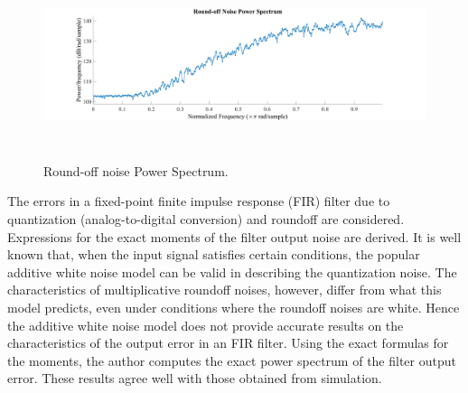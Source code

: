 \begin{enumerate}[label=\roman*]

\par

\par


\vspace{\baselineskip}



\begin{figure}[H]
	\begin{Center}
		\includegraphics[width=6.46in,height=2.19in]{25}
		\caption{ Round-off noise Power Spectrum.}
		\label{fig:_11_Roundoff_noise_Power_Spectrum}
	\end{Center}
\end{figure}


The errors in a fixed-point finite impulse response (FIR) filter due to quantization (analog-to-digital conversion) and roundoff are considered. Expressions for the exact moments of the filter output noise are derived. It is well known that, when the input signal satisfies certain conditions, the popular additive white noise model can be valid in describing the quantization noise. The characteristics of multiplicative roundoff noises, however, differ from what this model predicts, even under conditions where the roundoff noises are white. Hence the additive white noise model does not provide accurate results on the characteristics of the output error in an FIR filter. Using the exact formulas for the moments, the author computes the exact power spectrum of the filter output error. These results agree well with those obtained from simulation.
\par

\par




\end{enumerate}
